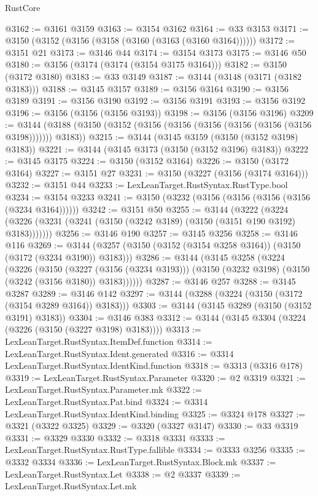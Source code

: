 \begin{lexlean}{RustCore}
\begin{coremodule}
@3162 := @3161 @3159
@3163 := @3154 @3162
@3164 := @33 @3153
@3171 := @3150 (@3152 (@3156 (@3158 (@3160 (@3163 (@3160 @3164))))))
@3172 := @3151 @21
@3173 := @3146 @44
@3174 := @3154 @3173
@3175 := @3146 @50
@3180 := @3156 (@3174 (@3174 (@3154 @3175 @3164)))
@3182 := @3150 (@3172 @3180)
@3183 := @33 @3149
@3187 := @3144 (@3148 (@3171 (@3182 @3183)))
@3188 := @3145 @3157
@3189 := @3156 @3164
@3190 := @3156 @3189
@3191 := @3156 @3190
@3192 := @3156 @3191
@3193 := @3156 @3192
@3196 := @3156 (@3156 (@3156 @3193))
@3198 := @3156 (@3156 @3196)
@3209 := @3144 (@3188 (@3150 (@3152 (@3156 (@3156 (@3156 (@3156 (@3156 (@3156 @3198))))))) @3183))
@3215 := @3144 (@3145 @3159 (@3150 (@3152 @3198) @3183))
@3221 := @3144 (@3145 @3173 (@3150 (@3152 @3196) @3183))
@3222 := @3145 @3175
@3224 := @3150 (@3152 @3164)
@3226 := @3150 (@3172 @3164)
@3227 := @3151 @27
@3231 := @3150 (@3227 (@3156 (@3174 @3164)))
@3232 := @3151 @44
@3233 := LexLeanTarget.RustSyntax.RustType.bool
@3234 := @3154 @3233
@3241 := @3150 (@3232 (@3156 (@3156 (@3156 (@3156 (@3234 @3164))))))
@3242 := @3151 @50
@3255 := @3144
    (@3222 (@3224 (@3226 (@3231 (@3241 (@3150 (@3242 @3189) (@3150 (@3151 @190 @3192) @3183)))))))
@3256 := @3146 @190
@3257 := @3145 @3256
@3258 := @3146 @116
@3269 := @3144 (@3257 (@3150 (@3152 (@3154 @3258 @3164)) (@3150 (@3172 (@3234 @3190)) @3183)))
@3286 := @3144
    (@3145
      @3258
      (@3224
        (@3226
          (@3150
            (@3227 (@3156 (@3234 @3193)))
            (@3150 (@3232 @3198) (@3150 (@3242 (@3156 @3180)) @3183))))))
@3287 := @3146 @257
@3288 := @3145 @3287
@3289 := @3146 @142
@3297 := @3144 (@3288 (@3224 (@3150 (@3172 (@3154 @3289 @3164)) @3183)))
@3303 := @3144 (@3145 @3289 (@3150 (@3152 @3191) @3183))
@3304 := @3146 @383
@3312 := @3144 (@3145 @3304 (@3224 (@3226 (@3150 (@3227 @3198) @3183))))
@3313 := LexLeanTarget.RustSyntax.ItemDef.function
@3314 := LexLeanTarget.RustSyntax.Ident.generated
@3316 := @3314 LexLeanTarget.RustSyntax.IdentKind.function
@3318 := @3313 (@3316 @178)
@3319 := LexLeanTarget.RustSyntax.Parameter
@3320 := @2 @3319
@3321 := LexLeanTarget.RustSyntax.Parameter.mk
@3322 := LexLeanTarget.RustSyntax.Pat.bind
@3324 := @3314 LexLeanTarget.RustSyntax.IdentKind.binding
@3325 := @3324 @178
@3327 := @3321 (@3322 @3325)
@3329 := @3320 (@3327 @3147)
@3330 := @33 @3319
@3331 := @3329 @3330
@3332 := @3318 @3331
@3333 := LexLeanTarget.RustSyntax.RustType.fallible
@3334 := @3333 @3256
@3335 := @3332 @3334
@3336 := LexLeanTarget.RustSyntax.Block.mk
@3337 := LexLeanTarget.RustSyntax.Let
@3338 := @2 @3337
@3339 := LexLeanTarget.RustSyntax.Let.mk

\end{coremodule}
\end{lexlean}

